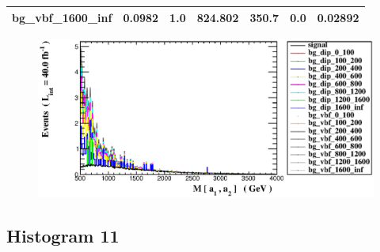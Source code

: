 \documentclass[a4paper, 10pt]{article}
\begin{document}
\begin{table}[H]
\begin{center}
\begin{tabular}{|m{23.0mm}|m{23.0mm}|m{18.0mm}|m{19.0mm}|m{19.0mm}|m{19.0mm}|m{19.0mm}|}
      \hline
      {\cellcolor{white}         bg\_vbf\_1600\_inf}& {\cellcolor{white}         0.0982}& {\cellcolor{white}         1.0}& {\cellcolor{white}         824.802}& {\cellcolor{white}         350.7}& {\cellcolor{green}         0.0}& {\cellcolor{green}         0.02892}\\
\hline
    \end{tabular}
  \end{center}
\end{table}

\begin{figure}[H]
  \begin{center}
    \includegraphics[scale=0.45]{selection_9.eps}\\
\caption{   }
  \end{center}
\end{figure}
      \newpage
\subsection{ Histogram 11}
\end{document}
